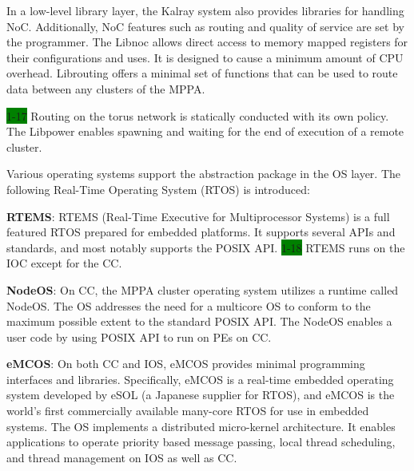 \documentclass[conference,compsoc]{IEEEtran}
\begin{document}
In a low-level library layer, the Kalray system also provides libraries for handling NoC.
Additionally, NoC features such as routing and quality of service are set by the programmer.
The Libnoc allows direct access to memory mapped registers for their configurations and uses.
It is designed to cause a minimum amount of CPU overhead.
Librouting offers a minimal set of functions that can be used to route data between any clusters of the MPPA.

\colorbox{green}{1-17}
Routing on the torus network is statically conducted with its own policy.
The Libpower enables spawning and waiting for the end of execution of a remote cluster.

Various operating systems support the abstraction package in the OS layer.
The following Real-Time Operating System (RTOS) is introduced:

\textbf{RTEMS}: RTEMS (Real-Time Executive for Multiprocessor Systems) is a full featured RTOS prepared for embedded platforms.
It supports several APIs and standards, and most notably supports the POSIX API.
\colorbox{green}{1-18}
RTEMS runs on the IOC except for the CC.

\textbf{NodeOS}: On CC, the MPPA cluster operating system utilizes a runtime called NodeOS.
The OS addresses the need for a multicore OS to conform to the maximum possible extent to the standard POSIX API.
The NodeOS enables a user code by using POSIX API to run on PEs on CC.

\textbf{eMCOS}: On both CC and IOS, eMCOS provides minimal programming interfaces and libraries.
Specifically, eMCOS is a real-time embedded operating system developed by eSOL (a Japanese supplier for RTOS), and eMCOS is the world's first commercially available many-core RTOS for use in embedded systems.
The OS implements a distributed micro-kernel architecture.
It enables applications to operate priority based message passing, local thread scheduling, and thread management on IOS as well as CC.
\end{document}
